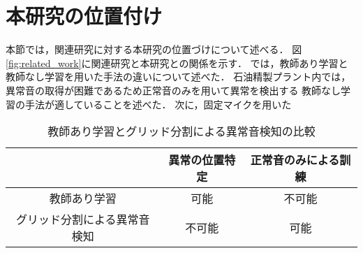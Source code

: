 \documentclass[../main]{subfiles}
\begin{document}
\section{本研究の位置付け}
\label{sec:related_work_summary}

本節では，関連研究に対する本研究の位置づけについて述べる．
図\ref{fig:related_work}に関連研究と本研究との関係を示す．
では，教師あり学習と教師なし学習を用いた手法の違いについて述べた．
石油精製プラント内では，異常音の取得が困難であるため正常音のみを用いて異常を検出する
教師なし学習の手法が適していることを述べた．
次に，固定マイクを用いた

\begin{table}[htbp]
  \centering
  \caption{教師あり学習とグリッド分割による異常音検知の比較}
  \label{tab:comparison}
  \begin{tabular}{|c|c|c|}
  \hline
   & 異常の位置特定 & 正常音のみによる訓練 \\ \hline
  教師あり学習 & 可能 & 不可能 \\ \hline
  グリッド分割による異常音検知 & 不可能 & 可能 \\ \hline
  \end{tabular}
\end{table}

\end{document}

